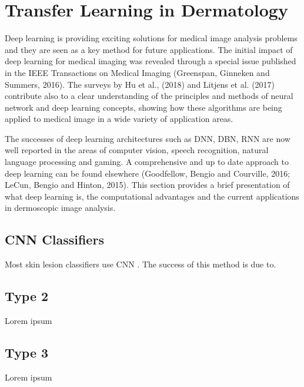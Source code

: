 \chapter{Transfer Learning in Dermatology}
\label{chapter:sota}


Deep learning is providing exciting solutions for medical image analysis problems and they are seen as a key method for future applications. The initial impact of deep learning for medical imaging was revealed through a special issue published in the IEEE Transactions on Medical Imaging (Greenspan, Ginneken and Summers, 2016). The surveys by Hu et al., (2018) and Litjens et al. (2017) contribute also to a clear understanding of the principles and methods of neural network and deep learning concepts, showing how these algorithms are being applied to medical image in a wide variety of application areas.

The successes of deep learning architectures such as \ac{DNN}, \ac{DBN}, \ac{RNN} are now well reported in the areas of computer vision, speech recognition, natural language processing and gaming. A comprehensive and up to date approach to deep learning can be found elsewhere (Goodfellow, Bengio and Courville, 2016; LeCun, Bengio and Hinton, 2015). This section provides a brief presentation of what deep learning is, the computational advantages and the current applications in dermoscopic image analysis.

\section{CNN Classifiers}
Most skin lesion classifiers use \ac{CNN} \cite{brinker2018}. The success of this method is due to.

\section{Type 2}
Lorem ipsum

\section{Type 3}
Lorem ipsum
